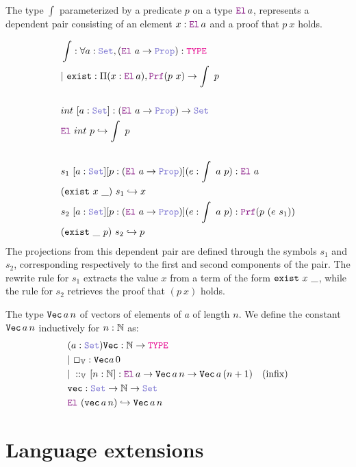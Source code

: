 \begin{definition}\label{dep-pair-def}
The type $\int$ \index{$\int$} parameterized by a predicate $p$ on a type $\el\,a$, represents a dependent pair consisting of an element $x : \el\,a$ and a proof that $p~x$ holds.

\begin{align*}
&\int: \forall a : \set{}, (\el{}~a \ra \prop): \type \\
&|~\kw{exist} : \Pi (x :\el{}\,a), \prf (p~x) \ra \int~p \\
&\\
& int~[a: \set{}]: (\el{}~a \ra \prop) \ra \set{} \\
& \el{}~int~p \re \int~p \\
&\\
& s_1 \index{$s_1$} ~[a: \set{}] [p:(\el{}~a \ra \prop)] (e: \int~a~p): \el{}~a \\
& (\kw{exist}~x~\_)~s_1 \re x\\
& s_2 \index{$s_2$}~[a: \set{}] [p:(\el{}~a \ra \prop)] (e: \int~a~p): \prf{}(p~(e~s_1)) \\
& (\kw{exist}~\_~p)~s_2 \re p\\
\end{align*}
The projections from this dependent pair are defined through the symbols $s_1$ and $s_2$, corresponding respectively to the first and second components of the pair.
The rewrite rule for $s_1$ extracts the value $x$ from a term of the form $\texttt{\upshape{exist}}~x~\_$, while the rule for $s_2$ retrieves the proof that $(p~x)$ holds.
\end{definition}

\begin{definition}\label{def:dependent-vector}
The type \( \texttt{\upshape{Vec}}\,a\,n \)  of vectors of elements of $a$ of length $n$.
We define the constant \( \texttt{\upshape{Vec}}\,a\,n \) inductively for \( n : \mathbb{N} \) as:
\begin{align*}
&(a: \set) \kw{Vec}: \N \ra \type \\
&|~\Box_\bb{V} : \kw{Vec} a \, 0 \\
&|~\cons_\bb{V}\,[n:\N]: \el\,a \ra \kw{Vec}\,a\,n \ra  \kw{Vec}\,a\,(n +1) \quad (\text{infix})\\
&\kw{vec}: \set \ra \N \ra \set \\
&\el~(\kw{vec}\,a\,n) \re \kw{Vec}\,a\,n
\end{align*}
\end{definition}

\section{Language extensions}
\label{sec:lambdapi-extension}

